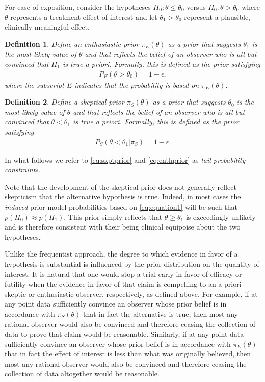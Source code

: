 \documentclass[12pt]{article}
\newtheorem{mydef}{Definition}
\begin{document}
For ease of exposition, consider the hypotheses $H_0: \theta \le \theta_0$ versus $H_0: \theta > \theta_0$ where $\theta$ represents a treatment effect of interest and let $\theta_1>\theta_0$ 
represent a plausible, clinically meaningful effect.
%
\begin{mydef}
Define an enthusiastic prior $\pi_{E}(\theta)$ as a prior that suggests $\theta_1$ is the most likely value of $\theta$ 
and that reflects the belief of an observer who is \textit{all but convinced} that $H_1$ is true a priori. 
%
Formally, this is defined as the prior satisfying
\begin{align}\label{eq:skptprior}
P_E(\theta >\theta_0)=1-\epsilon,
\end{align}
where the subscript $E$ indicates that the probability is based on $\pi_{E}(\theta)$.
%
\end{mydef}
\begin{mydef}
Define a skeptical prior $\pi_{S}(\theta)$ as a prior that suggests $\theta_0$ is the most likely value of $\theta$ 
and that reflects the belief of an observer who is \textit{all but convinced} that $\theta <\theta_1$ is true a priori. 
%
Formally, this is defined as the prior satisfying
\begin{align}\label{eq:enthprior}
P_S(\theta <\theta_1| \pi_{S})=1-\epsilon.
\end{align}
%
\end{mydef}
In what follows we refer to \eqref{eq:skptprior} and \eqref{eq:enthprior} as \textit{tail-probability constraints}.

Note that the development of the skeptical prior does not generally reflect skepticism that the alternative hypothesis is true. 
%
Indeed, in most cases the \textit{induced} prior model probabilities based on \eqref{eq:equation1} will be such that $p(H_0) \approx p(H_1)$.
%
This prior simply reflects that $\theta \ge \theta_1$ is exceedingly unlikely and is therefore 
consistent with their being clinical equipoise about the two hypotheses.
%

Unlike the frequentist approach, the degree to which evidence in favor of a hypothesis is substantial is influenced by 
the prior distribution on the quantity of interest.
%
It is natural that one would stop a trial early in favor of efficacy or futility when the evidence in favor of that claim is compelling
to an a priori skeptic or enthusiastic observer, respectively, as defined above.
%
For example, if at any point data sufficiently convince an observer whose prior belief is in accordance with $\pi_{S}(\theta)$ that in fact
the alternative is true, then most any rational observer would also be convinced and therefore ceasing the collection of data
to prove that claim would be reasonable.
%
Similarly, if at any point data sufficiently convince an observer whose prior belief is in accordance with $\pi_{E}(\theta)$ that in fact
the effect of interest is less than what was originally believed, then most any rational observer would also be convinced and therefore ceasing 
the collection of data altogether would be reasonable.
\end{document}

